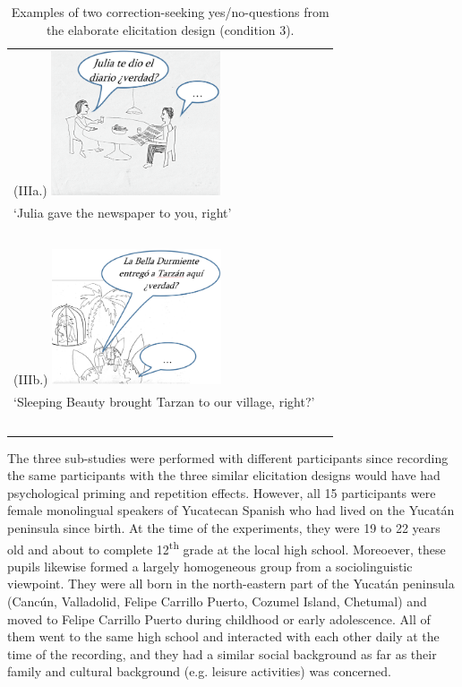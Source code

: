 \documentclass[output=paper]{langsci/langscibook}
\begin{document}
\begin{table}
\begin{tabularx}{\textwidth}{p{5cm}p{6cm}}
\begin{minipage}[t]{5cm}(IIIa.)
\includegraphics[width=5cm]{figures/UTH-img18new.png}
\end{minipage}& \begin{minipage}[t]{6cm}
\ \\
{‘Julia gave the newspaper to you, right’}
\end{minipage}\\
\ \\
\begin{minipage}[t]{5cm}(IIIb.)
\includegraphics[width=5cm]{figures/UTH-img19.png}
\end{minipage}& \begin{minipage}[t]{6cm}
\ \\
{‘Sleeping Beauty brought Tarzan to our village, right?’}
\end{minipage}\\
\ \\
\end{tabularx}
\caption{Examples of two correction-seeking yes/no-questions from the elaborate elicitation design (condition 3).}
\label{tab:uth:3}
\end{table}


The three sub-studies were performed with different participants since recording the same participants with the three similar elicitation designs would have had psychological priming and repetition effects. However, all 15 participants were female monolingual speakers of Yucatecan Spanish who had lived on the Yucatán peninsula since birth. At the time of the experiments, they were 19 to 22 years old and about to complete 12\textsuperscript{th} grade at the local high school. Moreoever, these pupils likewise formed a largely homogeneous group from a sociolinguistic viewpoint. They were all born in the north-eastern part of the Yucatán peninsula (Cancún, Valladolid, Felipe Carrillo Puerto, Cozumel Island, Chetumal) and moved to Felipe Carrillo Puerto during childhood or early adolescence. All of them went to the same high school and interacted with each other daily at the time of the recording, and they had a similar social background as far as their family and cultural background (e.g. leisure activities) was concerned. 
\end{document}
